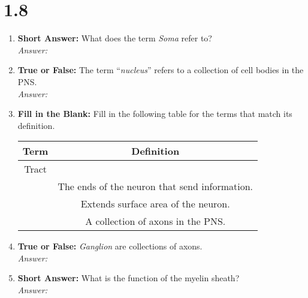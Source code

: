 \begin{enumerate}[label=\textbf{Q1.7.\arabic*}]
\end{enumerate}
\squigglyline

\section*{1.8}
\begin{enumerate}[label=\textbf{Q1.8.\arabic*}]

      \item \textbf{Short Answer:} What does the term \textit{Soma} refer to? \\
            \textit{Answer:}%

      \item \textbf{True or False:} The term ``\textit{nucleus}'' refers to a collection of cell bodies in the PNS. \\
            \textit{Answer:} %
\newpage
      \item \textbf{Fill in the Blank:} Fill in the following table for the terms that match its definition. 

            \begin{tabular}[htbp]{cc}
                  \toprule
                  \textbf{Term}            & \textbf{Definition}                           \\ \midrule
                  Tract                    & \underline{\hspace{10cm}}                     \\[0.5em]
                  \underline{\hspace{3cm}} & The ends of the neuron that send information. \\[0.5em]
                  \underline{\hspace{3cm}} & Extends surface area of the neuron.           \\[0.5em]
                  \underline{\hspace{3cm}} & A collection of axons in the PNS.             \\        \bottomrule
            \end{tabular}

      \item \textbf{True or False:} \textit{Ganglion} are collections of axons. \\
            \textit{Answer:} %

      \item \textbf{Short Answer:} What is the function of the myelin sheath? \\
            \textit{Answer:} %
\end{enumerate}
\squigglyline
